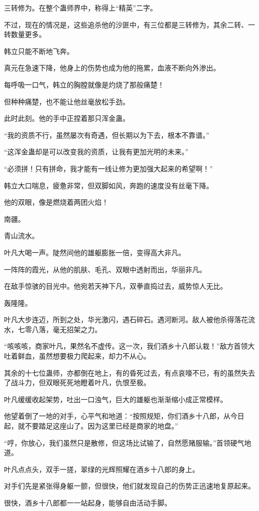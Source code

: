 \begin{this_body}
三转修为。在整个蛊师界中，称得上“精英”二字。

不过，现在的情况是，这些追杀他的沙匪中，有三位都是三转修为，其余二转、一转数量更多。

韩立只能不断地飞奔。

真元在急速下降，他身上的伤势也成为他的拖累，血液不断向外渗出。

每呼吸一口气，韩立的胸膛就像是灼烧了那般痛楚！

但种种痛楚，也不能让他丝毫放松手劲。

此时此刻。他的手中正捏着那只浑金蛊。

“我的资质不行，虽然屡次有奇遇，但长期以为下去，根本不靠谱。”

“这浑金蛊却是可以改变我的资质，让我有更加光明的未来。”

“必须拼！只有拼命，我才能有一线让修为更加强大起来的希望啊！”

韩立大口喘息，疲惫非常，但双脚如风，奔跑的速度没有丝毫下降。

他的双眼，像是燃烧着两团火焰！

南疆。

青山流水。

叶凡大喝一声。陡然间他的雄躯膨胀一倍，变得高大非凡。

一阵阵的霞光，从他的肌肤、毛孔、双眼中透射而出，华丽非凡。

在敌手惊骇的目光中。他宛若天神下凡，双拳直捣过去，威势惊人无比。

轰隆隆。

叶凡大步连迈，所到之处，华光激闪，遇石碎石。遇河断河。敌人被他杀得落花流水，七零八落，毫无招架之力。

“咳咳咳，商家叶凡，果然名不虚传。这一次，我们酒乡十八郎认栽！”敌方首领大吐着鲜血，虽然想要极力爬起来，却力不从心。

其余的十七位蛊师，亦都倒在地上，有的昏死过去，有点哀嚎不已，有的虽然失去了战斗力，但双眼死死地瞪着叶凡，仇恨至极。

叶凡缓缓收起架势，吐出一口浊气，巨大的雄躯也渐渐缩小成正常模样。

他望着倒了一地的对手，心平气和地道：“按照规矩，你们酒乡十八郎，从今日起，就不要踏足这座山了。因为这里已经是商家的地盘。”

“哼，你放心，我们虽然只是散修，但这场比试输了，自然愿赌服输。”首领硬气地道。

叶凡点点头，双手一搓，翠绿的光辉照耀在酒乡十八郎的身上。

对手们先是紧张得身躯一颤，但很快，他们就发现自己的伤势正迅速地复原起来。

很快，酒乡十八郎都一一站起身，能够自由活动手脚。


\end{this_body}
